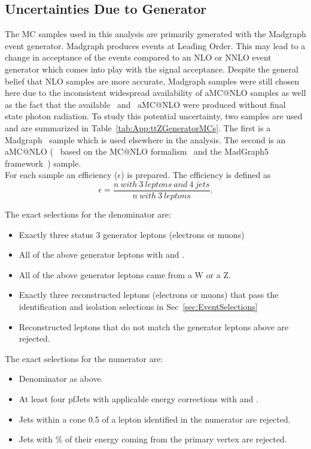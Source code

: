 \subsection{Uncertainties Due to Generator}	

The MC samples used in this analysis are primarily generated with the Madgraph event generator. Madgraph produces events at Leading Order. This may lead to a change in acceptance of the events compared to an NLO or NNLO event generator which comes into play with the signal acceptance. Despite the general belief that NLO samples are more accurate, Madgraph samples were still chosen here due to the inconsistent widespread availability of aMC@NLO samples as well as the fact that the available \ttZ \ and \ttW \ aMC@NLO were produced without final state photon radiation. To study this potential uncertainty, two \ttZ samples are used and are summarized in Table~\ref{tab:App:ttZGeneratorMCs}. The first is a Madgraph~\cite{Alwall:2011uj} sample which is used elsewhere in the analysis. The second is an aMC@NLO (~\cite{Frederix:2011zi, Frederix:2011ss} based on the MC@NLO formalism~\cite{Frixione:2002ik} and the MadGraph5 framework~\cite{Alwall:2011uj}) sample. \\




For each sample an efficiency ($\epsilon$) is prepared. The efficiency is defined as
\begin{equation}
\epsilon = \frac{n\ with\ 3\ leptons\ and\ 4\ jets}{n\ with\ 3\ leptons}.
\end{equation}

The exact selections for the denominator are:
\begin{itemize}
\item Exactly three status 3 generator leptons (electrons or muons)
\item All of the above generator leptons with \pt {} \GeV and \aeta {}.
\item All of the above generator leptons came from a W or a Z.
\item Exactly three reconstructed leptons (electrons or muons) that pass the identification and isolation selections in Sec~\ref{sec:EventSelections}
\item Reconstructed leptons that do not match the generator leptons above are rejected.
\end{itemize}

The exact selections for the numerator are:
\begin{itemize}
\item Denominator as above.
\item At least four pfJets with applicable energy corrections with \pt {} \GeV and \aeta {}. 
\item Jets within a cone 0.5 of a lepton identified in the numerator are rejected.
\item Jets with \% of their energy coming from the primary vertex are rejected.
\end{itemize}

